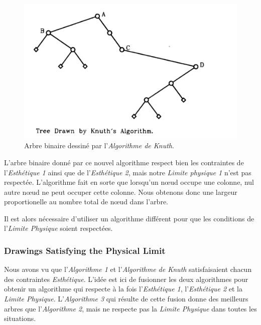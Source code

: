 \documentclass{article}
\begin{document}
    \vfill
    \begin{figure}[h]
    		\begin{center}
    			\includegraphics[scale=0.5]{arbreBinaire.png}
    		\end{center}
    	\caption{Arbre binaire dessiné par l'\emph{Algorithme de Knuth}. \cite{article79}}
      \label{fig:arbreBinaire}
    \end{figure}
    \vfill

    L'arbre binaire donné par ce nouvel algorithme respect bien les contraintes de l'\emph{Esthétique 1} ainsi que de l'\emph{Esthétique 2}, mais notre \emph{Limite physique 1} n'est pas respectée. L'algorithme fait en sorte que lorsqu’un n\oe{}ud occupe une colonne, nul autre n\oe{}ud ne peut occuper cette colonne. Nous obtenons donc une largeur proportionelle au nombre total de n\oe{}ud dans l'arbre.

    Il est alors nécessaire d'utiliser un algorithme différent pour que les conditions de l'\emph{Limite Physique} soient respectées.

\newpage
    \subsubsection{Drawings Satisfying the Physical Limit}

    Nous avons vu que l'\emph{Algorithme 1} et l'\emph{Algorithme de Knuth} satisfaisaient chacun des contraintes \emph{Esthétique}. L'idée est ici de fusionner les deux algorithmes pour obtenir un algorithme qui respecte à la fois l'\emph{Esthétique 1}, l'\emph{Esthétique 2} et la \emph{Limite Physique}. L'\emph{Algorithme 3} qui résulte de cette fusion donne des meilleurs arbres que l'\emph{Algorithme 2}, mais ne respecte pas la \emph{Limite Physique} dans toutes les situations.
\end{document}
